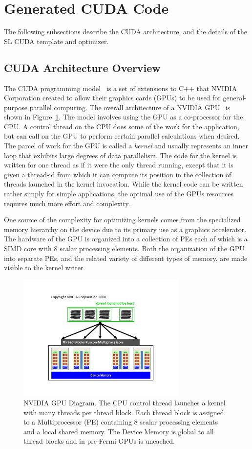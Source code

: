 \documentclass[preprint,nocopyrightspace]{styles/sigplanconf}
\begin{document}
\section{Generated CUDA Code}

The following subsections describe the CUDA architecture, and the 
details of the SL CUDA template and optimizer.

\subsection{CUDA Architecture Overview}

The CUDA programming model~\cite{CUDA1, CUDA2}
is a set of extensions to C++ that
NVIDIA Corporation created to allow 
their graphics cards (GPUs) to be used for general-purpose parallel 
computing.
The overall architecture of a NVIDIA GPU~\cite{Fermi} 
is shown in Figure~\ref{fig:CUDAOrg}.
The model involves using the GPU as a co-processor for the CPU.
A control thread on the CPU does some of the work for the application, 
but can call on the GPU to perform certain parallel calculations
when desired.  
The parcel of work for the GPU is called a {\em kernel}
and usually represents an inner loop that exhibits large degrees of
data parallelism.  The code for the kernel is written for one thread
as if it were the only thread running, except that it is given a
thread-id from which it can compute its position in the collection of
threads launched in the kernel invocation.  While the kernel code can
be written rather simply for simple applications, the optimal use of the
GPUs resources requires much more effort and complexity.

One source of the complexity for optimizing kernels comes from the
specialized memory hierarchy on the device due to its primary use as a graphics
accelerator.  The hardware of the GPU is organized into a collection of PEs
each of which is a SIMD core with 8 scalar processing elements.  
Both the organization of the GPU into separate PEs, and the related variety of
different types of memory, are made visible to the kernel writer.

\begin{figure}
\includegraphics[clip,trim=1.4in 0.6in 1.4in 1.0in,width=3.3in]{figures/CUDADiagram}
\caption{NVIDIA GPU Diagram.  
The CPU control thread launches a kernel
with many threads per thread block.
Each thread block is assigned to a Multiprocessor (PE) containing
8 scalar processing elements and a local shared memory.
The Device Memory is global to all thread blocks and in pre-Fermi
GPUs is uncached.}
\label{fig:CUDAOrg}
\end{figure}
\end{document}

